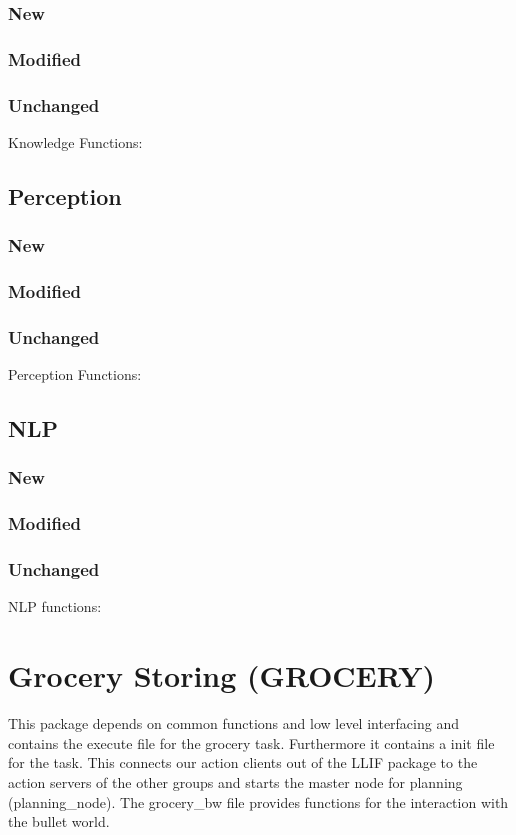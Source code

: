 \documentclass[main.tex]{subfiles}
\begin{document}
                \subsubsection{New}
                \subsubsection{Modified}
                \subsubsection{Unchanged}Knowledge Functions:
                
                \subsection{Perception}
                \subsubsection{New}
                \subsubsection{Modified}
                \subsubsection{Unchanged}Perception Functions:
                
                \subsection{NLP}
                \subsubsection{New}
                \subsubsection{Modified}
                \subsubsection{Unchanged}NLP functions:
                
                \section{Grocery Storing (GROCERY)}
                This package depends on common functions and low level interfacing and contains the execute file for the grocery task. Furthermore it contains a init file for the task. This connects our action clients out of the LLIF package to the action servers of the other groups and starts the master node for planning (planning\_node). The grocery\_bw file provides functions for the interaction with the bullet world.   
\end{document}
